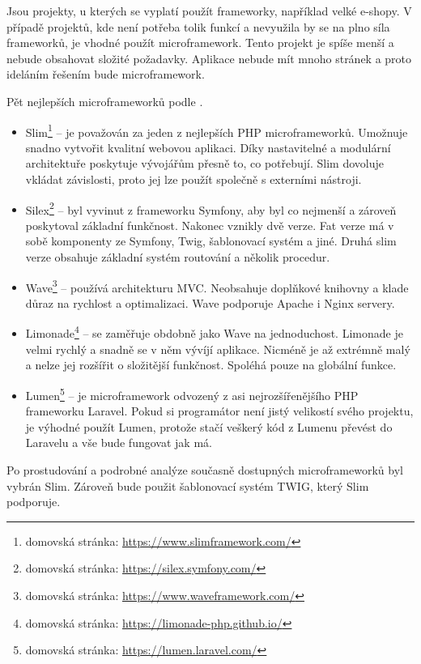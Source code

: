             Jsou projekty, u kterých se vyplatí použít frameworky, například velké e-shopy. V případě projektů, kde není potřeba tolik funkcí a nevyužila by se na plno síla frameworků, je vhodné použít microframework. Tento projekt je spíše menší a nebude obsahovat složité požadavky. Aplikace nebude mít mnoho stránek a proto ideláním řešením bude microframework.
            
            Pět nejlepších microframeworků podle \cite{microframeworks}.
            
            \begin{itemize}
                \item Slim\footnote{domovská stránka: \url{https://www.slimframework.com/}} – je považován za jeden z nejlepších PHP microframeworků. Umožnuje snadno vytvořit kvalitní webovou aplikaci. Díky nastavitelné a modulární architektuře poskytuje vývojářům přesně to, co potřebují. Slim dovoluje vkládat závislosti, proto jej lze použít společně s externími nástroji.
                
                \item Silex\footnote{domovská stránka: \url{https://silex.symfony.com/}} – byl vyvinut z frameworku Symfony, aby byl co nejmenší a zároveň poskytoval základní funkčnost. Nakonec vznikly dvě verze. Fat verze má v sobě komponenty ze Symfony, Twig, šablonovací systém a jiné. Druhá slim verze obsahuje základní systém routování a několik procedur. 
                
                \item Wave\footnote{domovská stránka: \url{https://www.waveframework.com/}} – používá architekturu MVC. Neobsahuje doplňkové knihovny a klade důraz na rychlost a optimalizaci. Wave podporuje Apache i Nginx servery.
                
                \item Limonade\footnote{domovská stránka: \url{https://limonade-php.github.io/}} – se zaměřuje obdobně jako Wave na jednoduchost. Limonade je velmi rychlý a snadně se v něm vývíjí aplikace. Nicméně je až extrémně malý a nelze jej rozšířit o složitější funkčnost. Spoléhá pouze na globální funkce.
                
                \item Lumen\footnote{domovská stránka: \url{https://lumen.laravel.com/}} – je microframework odvozený z asi nejrozšířenějšího PHP frameworku Laravel. Pokud si programátor není jistý velikostí svého projektu, je výhodné použít Lumen, protože stačí veškerý kód z Lumenu převést do Laravelu a vše bude fungovat jak má.
            \end{itemize}
        
        Po prostudování a podrobné analýze současně dostupných microframeworků byl vybrán Slim. Zároveň bude použit šablonovací systém TWIG, který Slim podporuje.
        
